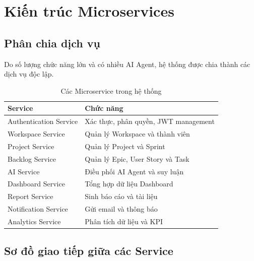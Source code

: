 \documentclass[12pt,a4paper]{report}
\begin{document}
\section{Kiến trúc Microservices}

\subsection{Phân chia dịch vụ}

Do số lượng chức năng lớn và có nhiều AI Agent, hệ thống được chia thành các dịch vụ độc lập.

\begin{table}[H]
\centering
\caption{Các Microservice trong hệ thống}
\begin{tabular}{|p{4.5cm}|p{9cm}|}
\hline
\textbf{Service} & \textbf{Chức năng} \\
\hline
Authentication Service & Xác thực, phân quyền, JWT management \\
\hline
Workspace Service & Quản lý Workspace và thành viên \\
\hline
Project Service & Quản lý Project và Sprint \\
\hline
Backlog Service & Quản lý Epic, User Story và Task \\
\hline
AI Service & Điều phối AI Agent và suy luận \\
\hline
Dashboard Service & Tổng hợp dữ liệu Dashboard \\
\hline
Report Service & Sinh báo cáo và tài liệu \\
\hline
Notification Service & Gửi email và thông báo \\
\hline
Analytics Service & Phân tích dữ liệu và KPI \\
\hline
\end{tabular}
\label{tab:microservices}
\end{table}

\subsection{Sơ đồ giao tiếp giữa các Service}
\end{document}
